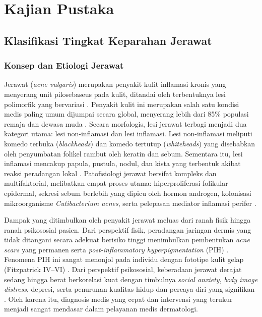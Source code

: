 \chapter{Kajian Pustaka}
\label{bab:kajianpustaka}

\section{Klasifikasi Tingkat Keparahan Jerawat}

\subsection{Konsep dan Etiologi Jerawat}
Jerawat (\textit{acne vulgaris}) merupakan penyakit kulit inflamasi kronis yang menyerang unit pilosebaseus pada kulit, ditandai oleh terbentuknya lesi polimorfik yang bervariasi \cite{jeong2023}. Penyakit kulit ini merupakan salah satu kondisi medis paling umum dijumpai secara global, menyerang lebih dari 85\% populasi remaja dan dewasa muda \cite{jeong2023}. Secara morfologis, lesi jerawat terbagi menjadi dua kategori utama: lesi non-inflamasi dan lesi inflamasi. Lesi non-inflamasi meliputi komedo terbuka (\textit{blackheads}) dan komedo tertutup (\textit{whiteheads}) yang disebabkan oleh penyumbatan folikel rambut oleh keratin dan sebum. Sementara itu, lesi inflamasi mencakup papula, pustula, nodul, dan kista yang terbentuk akibat reaksi peradangan lokal \cite{hayashi2008, jeong2023}. Patofisiologi jerawat bersifat kompleks dan multifaktorial, melibatkan empat proses utama: hiperproliferasi folikular epidermal, sekresi sebum berlebih yang dipicu oleh hormon androgen, kolonisasi mikroorganisme \textit{Cutibacterium acnes}, serta pelepasan mediator inflamasi perifer \cite{jeong2023}.

Dampak yang ditimbulkan oleh penyakit jerawat meluas dari ranah fisik hingga ranah psikososial pasien. Dari perspektif fisik, peradangan jaringan dermis yang tidak ditangani secara adekuat berisiko tinggi menimbulkan pembentukan \textit{acne scars} yang permanen serta \textit{post-inflammatory hyperpigmentation} (PIH) \cite{jeong2023}. Fenomena PIH ini sangat menonjol pada individu dengan fototipe kulit gelap (Fitzpatrick IV--VI) \cite{jeong2023}. Dari perspektif psikososial, keberadaan jerawat derajat sedang hingga berat berkorelasi kuat dengan timbulnya \textit{social anxiety}, \textit{body image distress}, depresi, serta penurunan kualitas hidup dan percaya diri yang signifikan \cite{jeong2023}. Oleh karena itu, diagnosis medis yang cepat dan intervensi yang terukur menjadi sangat mendasar dalam pelayanan medis dermatologi.

